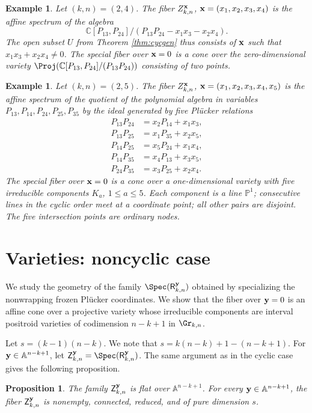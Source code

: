 \documentclass[11pt]{amsart}
\numberwithin{equation}{section}
\newtheorem{prop}[thm]{Proposition}
\newtheorem{example}[thm]{Example}
\newcommand{\bC}{{\mathbb C}}
\newcommand{\bP}{{\mathbb P}}
\newcommand{\bA}{{\mathbb A}}
\newcommand{\bfx}{{\bf x}}
\newcommand{\bfy}{{\bf y}}
\begin{document}
\begin{example}
Let $(k,n)=(2,4)$. The fiber
$Z_{k,n}^\bfx$, $\bfx=(x_1,x_2,x_3,x_4)$ is the affine spectrum of the algebra 
\[
\bC[P_{13},P_{24}]/(P_{13}P_{24} - x_1x_3 - x_2x_4).
\]
The open subset $U$ from Theorem \ref{thm:cycgen} thus consists of $\bfx$ such that $x_1x_3+x_2x_4\ne 0$.
The special fiber over $\bfx=0$ is a cone over the zero-dimensional variety $\Proj(\bC[P_{13},P_{24}]/(P_{13}P_{24}))$ consisting of two points. 
\end{example}

\begin{example}
Let $(k,n)=(2,5)$. The fiber
$Z_{k,n}^\bfx$, $\bfx=(x_1,x_2,x_3,x_4,x_5)$ is the affine spectrum of the quotient of the polynomial algebra in variables $P_{13},P_{14},P_{24},P_{25},P_{35}$ by the ideal generated by five Pl\"ucker relations  
\begin{align*}
P_{13}P_{24} &= x_2P_{14}+x_1x_3,\\
P_{13}P_{25} &= x_1P_{35}+x_2x_5,\\
P_{14}P_{25} &= x_5P_{24}+x_1x_4,\\
P_{14}P_{35} &= x_4P_{13}+x_3x_5,\\
P_{24}P_{35} &= x_3P_{25}+x_2x_4.
\end{align*}
The special fiber over $\bfx=0$ is a cone over a one-dimensional variety with five irreducible components $K_a$, $1\le a\le 5$.
Each component is a line $\bP^1$; consecutive lines in the cyclic order
meet at a coordinate point; all other pairs are disjoint. The five intersection points are ordinary nodes.
\end{example}


\section{Varieties: noncyclic case}\label{sec:varnoncyc}

We study the geometry of the family $\Spec({\mathsf R}_{k,n}^{\bfy})$
obtained by specializing the nonwrapping frozen Pl\"ucker coordinates.
We show that the fiber over $\bfy=0$ is an affine cone over a
projective variety whose irreducible components are interval
positroid varieties of codimension $n-k+1$ in $\Gr_{k,n}$.

Let $s=(k-1)(n-k)$. We note that $s=k(n-k)+1 - (n-k+1)$. For $\bfy\in \bA^{n-k+1}$, let ${\mathsf Z}_{k,n}^\bfy= \Spec({\mathsf R}_{k,n}^{\bfy})$. 
The same argument as in the cyclic case gives the following proposition.
\begin{prop}
The family ${\mathsf Z}_{k,n}^{\bfy}$ is flat over
$\bA^{n-k+1}$. For every $\bfy\in\bA^{n-k+1}$,
the fiber ${\mathsf Z}_{k,n}^{\bfy}$ is nonempty,
connected, reduced, and of pure dimension $s$.
\end{prop}
\end{document}
